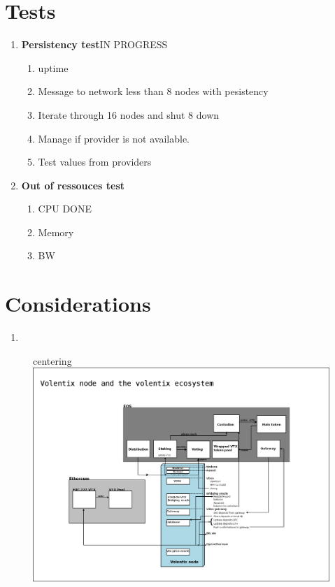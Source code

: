 \documentclass[]{article}
\begin{document}
\section{Tests}

					\begin{enumerate}
						\item \textbf{Persistency test}IN PROGRESS\\
							\begin{enumerate}
								\item uptime\textit{}
								\item Message to network less than 8 nodes with pesistency
								\item Iterate through 16 nodes and shut 8 down
								\item Manage if provider is not available.
								\item Test values from providers
							\end{enumerate}
						\item \textbf{Out of ressouces test}\\
						\begin{enumerate}
							\item CPU DONE
							\item Memory
							\item BW
						\end{enumerate}  
				\end{enumerate}
			\section{Considerations}
				\begin{enumerate}
				\item 
			\end{enumerate}  
			
\begin{figure}
centering
	\includegraphics[scale=0.2]{vltxnode.png}
\caption{}
\label{fig:whitebackground-ecosystem02}
\end{figure}
\end{document}
